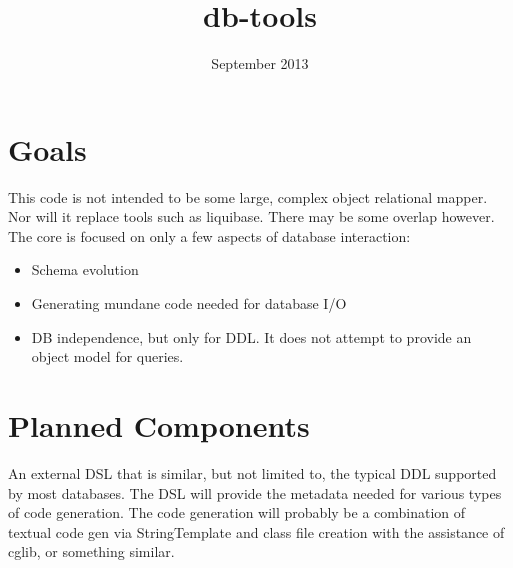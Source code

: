 \documentclass[10pt]{article}
\title{db-tools}
\date{September 2013}
\begin{document}
 \maketitle
\section{Goals}
This code is not intended to be some large, complex object relational mapper. Nor will it replace tools such as liquibase. There may be some overlap however. The core is focused on only a few aspects of database interaction: 
\begin{itemize}
	\item Schema evolution
	\item Generating mundane code needed for database I/O
        \item DB independence, but only for DDL. It does not attempt to provide an object model for queries.  
\end{itemize}

\section{Planned Components}
An external DSL that is similar, but not limited to, the typical DDL supported by most databases. The DSL will provide the metadata needed for various types of code generation. The code generation will probably be a combination of textual code gen via StringTemplate and class file creation with the assistance of cglib, or something similar.


\end{document}
